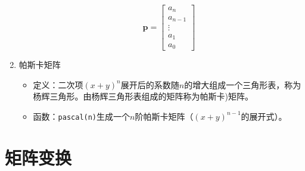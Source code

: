 \begin{enumerate}
\begin{itemize}
\begin{equation*}
	\bm{p} = 
	\begin{bmatrix}
		a_n\\
		a_{n-1}\\
		\vdots\\
		a_1\\
		a_0
	\end{bmatrix}
\end{equation*}
\end{itemize}
\item 帕斯卡矩阵
\begin{itemize}
	\item 定义：二次项$(x+y)^n$展开后的系数随$n$的增大组成一个三角形表，称为杨辉三角形。由杨辉三角形表组成的矩阵称为帕斯卡)矩阵。
	\item 函数：\lstinline|pascal(n)|生成一个$n$阶帕斯卡矩阵（$(x+y)^{n - 1}$的展开式）。
\end{itemize}
\end{enumerate}

\section{矩阵变换}
